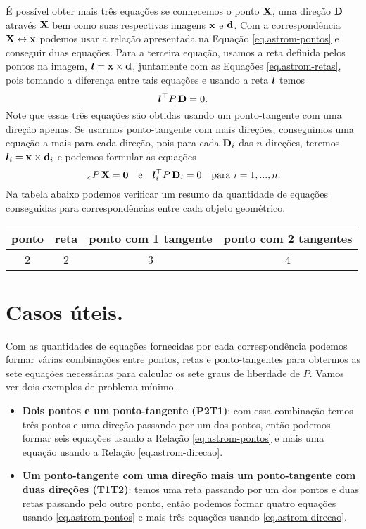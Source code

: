 É possível obter mais três equações se conhecemos o ponto $\mathbf{X}$, uma direção ${\bf D}$ através $\mathbf{X}$ bem como suas respectivas imagens $\mathbf{x}$ e ${\bf d}$. Com a correspondência $\mathbf{X}\leftrightarrow\mathbf{x}$ podemos usar a relação apresentada na Equaç\~ao \ref{eq.astrom-pontos} e conseguir duas equações. Para a terceira equação, usamos a reta definida pelos pontos na imagem, $\boldsymbol{l}=\mathbf{x}\times{\bf d}$, juntamente com as Equações \ref{eq.astrom-retas}, pois tomando a diferença entre tais equações e usando a reta $\boldsymbol{l}$ temos
\begin{equation}\label{eq.astrom-direcao}
\boldsymbol{l}^\top P\,{\bf D}=0.
\end{equation}  
Note que essas três equações são obtidas usando um ponto-tangente com uma direção apenas. Se usarmos ponto-tangente com mais direções, conseguimos uma equação a mais para cada direção, pois para cada ${\bf D}_i$ das $n$ direções, teremos $\boldsymbol{l}_i=\mathbf{x}\times{\bf d}_i$ e podemos formular as equações
\begin{equation}
[\x]_\times P\,\X={\bf 0}\quad\text{e}\quad\lightrgb_i^\top P\,{\bf D}_i=0\quad\text{para}\,\,i=1,...,n.
\end{equation}
Na tabela abaixo podemos verificar um resumo da quantidade de equações conseguidas para correspondências entre cada objeto geométrico.
\begin{center}
\begin{tabular}{|c|c|c|c|}
\hline 
{\bf ponto} & {\bf reta} & {\bf ponto com 1 tangente} & {\bf ponto com 2 tangentes} \\ 
\hline 
2 & 2 & 3 & 4 \\ 
\hline 
\end{tabular} 
\end{center}
\section*{Casos úteis.}

Com as quantidades de equações fornecidas por cada correspondência podemos formar várias combinações entre pontos, retas e ponto-tangentes para obtermos as sete equações necessárias para calcular os sete graus de liberdade de $P$. Vamos ver dois exemplos de problema mínimo.
\begin{itemize}
\item {\bf Dois pontos e um ponto-tangente (P2T1)}: com essa combinação temos três pontos e uma direção passando por um dos pontos, então podemos formar seis equações usando a Relação \ref{eq.astrom-pontos} e mais uma equação usando a Relação \ref{eq.astrom-direcao}. 

\item {\bf Um ponto-tangente com uma direção mais um ponto-tangente com duas direções (T1T2)}: temos uma reta passando por um dos pontos e duas retas passando pelo outro ponto, então podemos formar quatro equações usando \ref{eq.astrom-pontos} e mais três equações usando \ref{eq.astrom-direcao}.
\end{itemize} 

